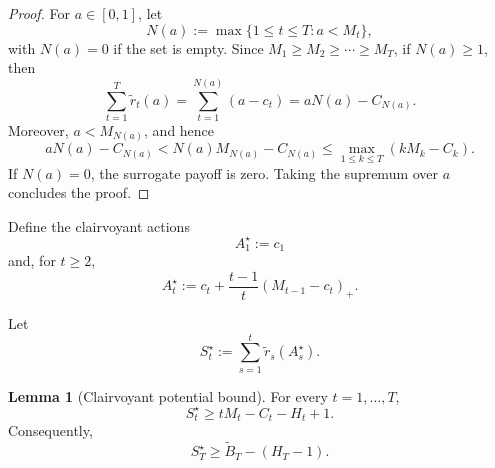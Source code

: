\documentclass[11pt]{article}
\theoremstyle{definition}
\newtheorem{lemma}{Lemma}
\begin{document}
\begin{proof}
For $a\in[0,1]$, let
\[
    N(a):=\max\{1\le t\le T:a<M_t\},
\]
with $N(a)=0$ if the set is empty. Since
$M_1\ge M_2\ge\cdots\ge M_T$, if $N(a)\ge1$, then
\[
    \sum_{t=1}^T\widetilde r_t(a)
    =
    \sum_{t=1}^{N(a)}(a-c_t)
    =
    aN(a)-C_{N(a)}.
\]
Moreover, $a<M_{N(a)}$, and hence
\[
    aN(a)-C_{N(a)}
    <
    N(a)M_{N(a)}-C_{N(a)}
    \le
    \max_{1\le k\le T}(kM_k-C_k).
\]
If $N(a)=0$, the surrogate payoff is zero.
Taking the supremum over $a$ concludes the proof.
\end{proof}

Define the clairvoyant actions
\[
    A_1^\star:=c_1
\]
and, for $t\ge2$,
\[
    A_t^\star
    :=
    c_t+\frac{t-1}{t}(M_{t-1}-c_t)_+.
\]

Let
\[
    S_t^\star:=\sum_{s=1}^t\widetilde r_s(A_s^\star).
\]

\begin{lemma}[Clairvoyant potential bound]
\label{lem:clairvoyant-potential}
For every $t=1,\ldots,T$,
\[
    S_t^\star\ge tM_t-C_t-H_t+1.
\]
Consequently,
\[
    S_T^\star\ge\widetilde B_T-(H_T-1).
\]
\end{lemma}
\end{document}
